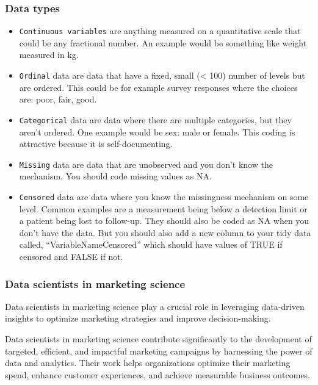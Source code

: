 \documentclass[
]{book}
\begin{document}
\hypertarget{data-types}{%
\subsubsection{Data types}\label{data-types}}

\begin{itemize}
\item
  \texttt{Continuous\ variables} are anything measured on a quantitative scale that could be any fractional number. An example would be something like weight measured in kg.
\item
  \texttt{Ordinal} data are data that have a fixed, small (\textless{} 100) number of levels but are ordered. This could be for example survey responses where the choices are: poor, fair, good.
\item
  \texttt{Categorical} data are data where there are multiple categories, but they aren't ordered. One example would be sex: male or female. This coding is attractive because it is self-documenting.
\item
  \texttt{Missing} data are data that are unobserved and you don't know the mechanism. You should code missing values as NA.
\item
  \texttt{Censored} data are data where you know the missingness mechanism on some level. Common examples are a measurement being below a detection limit or a patient being lost to follow-up. They should also be coded as NA when you don't have the data. But you should also add a new column to your tidy data called, ``VariableNameCensored'' which should have values of TRUE if censored and FALSE if not.
\end{itemize}

\hypertarget{data-scientists-in-marketing-science}{%
\subsubsection{Data scientists in marketing science}\label{data-scientists-in-marketing-science}}

Data scientists in marketing science play a crucial role in leveraging data-driven insights to optimize marketing strategies and improve decision-making.

Data scientists in marketing science contribute significantly to the development of targeted, efficient, and impactful marketing campaigns by harnessing the power of data and analytics. Their work helps organizations optimize their marketing spend, enhance customer experiences, and achieve measurable business outcomes.
\end{document}
